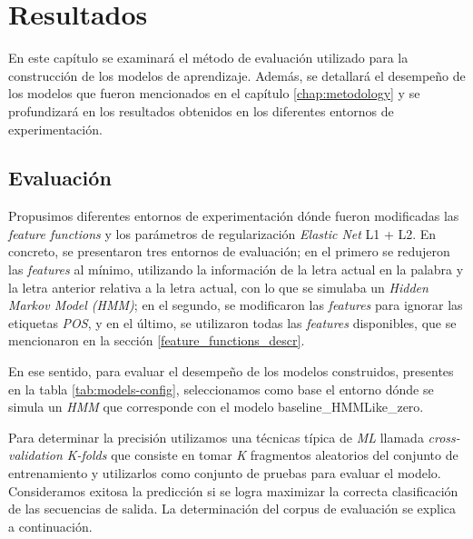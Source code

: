 \documentclass[letterpaper,12pt,oneside]{book}
\theoremstyle{definition}
\begin{document}
\chapter{Resultados}

En este capítulo se examinará el método de evaluación utilizado para la construcción de los modelos de aprendizaje. Además, se detallará el desempeño de los modelos que fueron mencionados en el capítulo \ref{chap:metodology} y se profundizará en los resultados obtenidos en los diferentes entornos de experimentación. 


\section{Evaluación}

Propusimos diferentes entornos de experimentación dónde fueron modificadas las \textit{feature functions} y los parámetros de regularización \textit{Elastic Net} L1 + L2. En concreto, se presentaron tres entornos de evaluación; en el primero se redujeron las \textit{features} al mínimo, utilizando la información de la letra actual en la palabra y la letra anterior relativa a la letra actual, con lo que se simulaba un \textit{Hidden Markov Model (HMM)}; en el segundo, se modificaron las \textit{features} para ignorar las etiquetas \textit{POS}, y en el último, se utilizaron todas las \textit{features} disponibles, que se mencionaron en la sección \ref{feature_functions_descr}.

En ese sentido, para evaluar el desempeño de los modelos construidos, presentes en la tabla \ref{tab:models-config}, seleccionamos como base el entorno dónde se simula un \textit{HMM} que corresponde con el modelo \textsf{baseline\_HMMLike\_zero}. 

Para determinar la precisión utilizamos una técnicas típica de \textit{ML} llamada \textit{cross-validation K-folds} que consiste en tomar \textit{K} fragmentos aleatorios del conjunto de entrenamiento y utilizarlos como conjunto de pruebas para evaluar el modelo. Consideramos exitosa la predicción si se logra maximizar la correcta clasificación de las secuencias de salida. La determinación del corpus de evaluación se explica a continuación.
\end{document}
